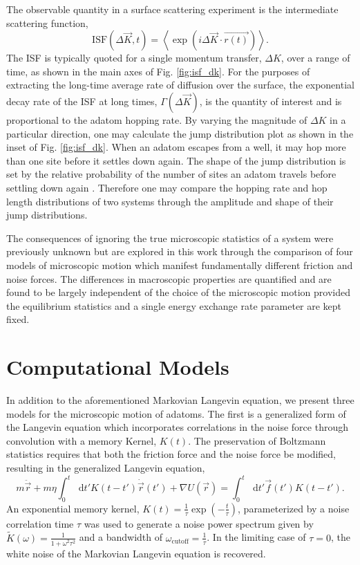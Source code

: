 \documentclass[7pt]{article}
\newcommand*{\diff}{\mathop{}\!\mathrm{d}}
\begin{document}
The observable quantity in a surface scattering experiment is the intermediate scattering function,
$$
\mathrm{ISF}(\Delta{\vec{K}}, t) = \left<\exp\left(i\Delta{\vec{K}}\cdot\vec{r(t)}\right)\right>.
$$
The ISF is typically quoted for a single momentum transfer, $\Delta{K}$, over a range of time, as shown in the main axes of Fig. \ref{fig:isf_dk}. For the purposes of extracting the long-time average rate of diffusion over the surface, the exponential decay rate of the ISF at long times, $\Gamma(\Delta{\vec{K}})$, is the quantity of interest and is proportional to the adatom hopping rate\cite{Chudley}. By varying the magnitude of $\Delta{K}$ in a particular direction, one may calculate the jump distribution plot as shown in the inset of Fig. \ref{fig:isf_dk}. When an adatom escapes from a well, it may hop more than one site before it settles down again. The shape of the jump distribution is set by the relative probability of the number of sites an adatom travels before settling down again \cite{Chudley}. Therefore one may compare the hopping rate and hop length distributions of two systems through the amplitude and shape of their jump distributions.

The consequences of ignoring the true microscopic statistics of a system were previously unknown but are explored in this work through the comparison of four models of microscopic motion which manifest fundamentally different friction and noise forces. The differences in macroscopic properties are quantified and are found to be largely independent of the choice of the microscopic motion provided the equilibrium statistics and a single energy exchange rate parameter are kept fixed. 

\section*{Computational Models}

In addition to the aforementioned Markovian Langevin equation, we present three models for the microscopic motion of adatoms. The first is a generalized form of the Langevin equation which incorporates correlations in the noise force through convolution with a memory Kernel, $K(t)$. The preservation of Boltzmann statistics requires that both the friction force and the noise force be modified, resulting in the generalized Langevin equation\cite{Kubo},
\begin{equation}
	m\ddot{\vec{r}}+m\eta\int_0^t\diff{t'}K(t-t')\dot{\vec{r}}(t')+\nabla U(\vec{r})=\int_0^t\diff{t'}\vec{f}(t')K(t-t').
	\label{eq:gle}
\end{equation}
An exponential memory kernel, $K(t)=\frac{1}{\tau}\exp\left(-\frac{t}{\tau}\right)$, parameterized by a noise correlation time $\tau$ was used to generate a noise power spectrum given by $\tilde{K}(\omega)=\frac{1}{1+\omega^2\tau^2}$ and a bandwidth of $\omega_\text{cutoff}=\frac{1}{\tau}$. In the limiting case of $\tau=0$, the white noise of the Markovian Langevin equation is recovered. 
\end{document}

